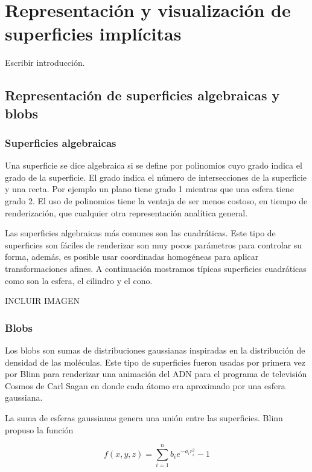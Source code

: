 \chapter{Representación y visualización de superficies implícitas}

Escribir introducción.

\section{Representación de superficies algebraicas y blobs}

\subsection{Superficies algebraicas}

Una superficie se dice algebraica si se define por polinomios cuyo grado indica el grado de la superficie. El grado indica el número de intersecciones de la superficie y una recta.\cite{Bloomenthal97} Por ejemplo un plano tiene grado 1 mientras que una esfera tiene grado 2. El uso de polinomios tiene la ventaja de ser menos costoso, en tiempo de renderización, que cualquier otra representación analítica general.
\par Las superficies algebraicas más comunes son las cuadráticas. Este tipo de superficies son fáciles de renderizar son muy pocos parámetros para controlar su forma, además, es posible usar coordinadas homogéneas para aplicar transformaciones afines. A continuación mostramos típicas superficies cuadráticas como son la esfera, el cilindro y el cono.
\par INCLUIR IMAGEN

\subsection{Blobs}

Los blobs son sumas de distribuciones gaussianas inspiradas en la distribución de densidad de las moléculas. Este tipo de superficies fueron usadas por primera vez por Blinn \cite{Blinn82} para renderizar una animación del ADN para el programa de televisión Cosmos de Carl Sagan en donde cada átomo era aproximado por una esfera gaussiana.
\par La suma de esferas gaussianas genera una unión entre las superficies. Blinn propuso la función

\begin{equation}
f(x,y,z) = \sum_{i=1}^{n} b_i e^{-a_i r_i^2} - 1
\nonumber
\end{equation}

